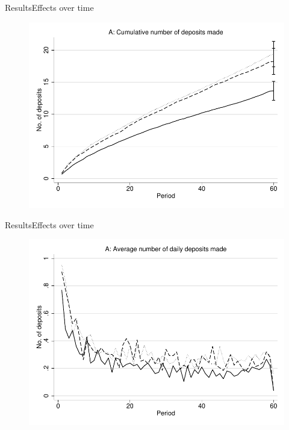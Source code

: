 \documentclass[aspectratio=169]{beamer}
\begin{document}
\begin{frame}{Results}{Effects over time}

	\begin{figure}[H]
		\centering
		\includegraphics[height=0.8\textheight]{line-mobile_cumdeposits.pdf}
	\end{figure}

\end{frame}

\begin{frame}{Results}{Effects over time}

	\begin{figure}[H]
		\centering
		\includegraphics[height=0.8\textheight]{line-mobile_deposits.pdf}
	\end{figure}

\end{frame}
\end{document}
